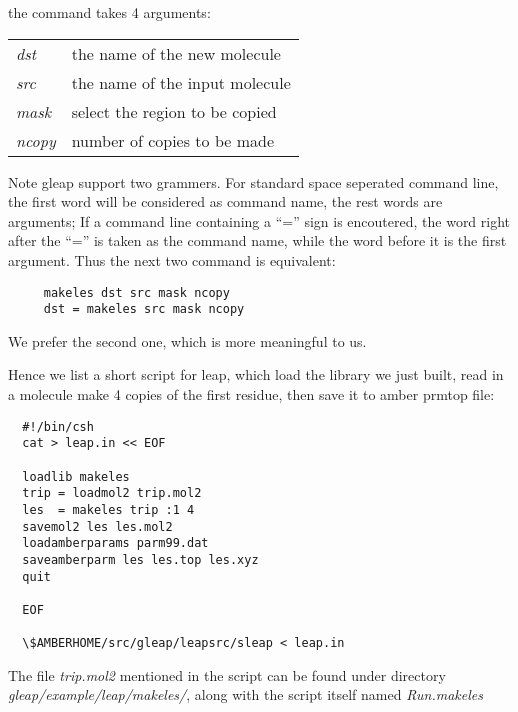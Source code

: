 \documentclass[letterpaper]{book}
\begin{document}
the command takes 4 arguments: 

\begin{tabular}{ll}
  {\it dst}   & the name of the new molecule \\
  {\it src}   & the name of the input molecule \\
  {\it mask}  & select the region to be copied \\
  {\it ncopy} & number of copies to be made
\end{tabular}

Note gleap support two grammers. For standard space seperated command line, the first word
will be considered as command name, the rest words are arguments; If a command line containing
a ``='' sign is encoutered, the word right after the ``='' is taken as the command name, while
the word before it is the first argument. Thus the next two command is equivalent:

\begin{lstlisting}
     makeles dst src mask ncopy
     dst = makeles src mask ncopy
\end{lstlisting}

We prefer the second one, which is more meaningful to us. 

Hence we list a short script for leap, which load the library we just built, read in a molecule
make 4 copies of the first residue, then save it to amber prmtop file:

\begin{lstlisting}
  #!/bin/csh
  cat > leap.in << EOF

  loadlib makeles
  trip = loadmol2 trip.mol2
  les  = makeles trip :1 4
  savemol2 les les.mol2
  loadamberparams parm99.dat
  saveamberparm les les.top les.xyz
  quit

  EOF

  \$AMBERHOME/src/gleap/leapsrc/sleap < leap.in

\end{lstlisting}

The file {\it trip.mol2} mentioned in the script can be found under directory 
{\it gleap/example/leap/makeles/}, along with the script itself named 
{\it Run.makeles}
\end{document}
